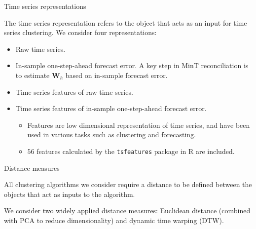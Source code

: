 \documentclass[aspectratio=169]{beamer}
\begin{document}
\begin{frame}{Time series representations}

	The time series representation refers to the object that acts as an input for time series clustering. We consider four representations:
	\begin{itemize}
		\item {\color{red} Raw time series}.
		\item {\color{red} In-sample one-step-ahead forecast error}. A key step in MinT reconciliation is to estimate $\boldsymbol{W}_h$ based on in-sample forecast error.
		\item {\color{red} Time series features of raw time series}.
		\item {\color{red} Time series features of in-sample one-step-ahead forecast error}. 
		\begin{itemize}
			\item Features are low dimensional representation of time series, and have been used in various tasks such as clustering and forecasting.
			\item $56$ features calculated by the \texttt{tsfeatures} package in R are included.
		\end{itemize}
	\end{itemize}
\end{frame}


\begin{frame}{Distance measures}

	All clustering algorithms we consider require a distance to be defined between the objects that act as inputs to the algorithm. 
	
	We consider two widely applied distance measures: {\color{red} Euclidean distance} (combined with PCA to reduce dimensionality) and {\color{red} dynamic time warping (DTW)}.
	
	
\end{frame}
\end{document}
